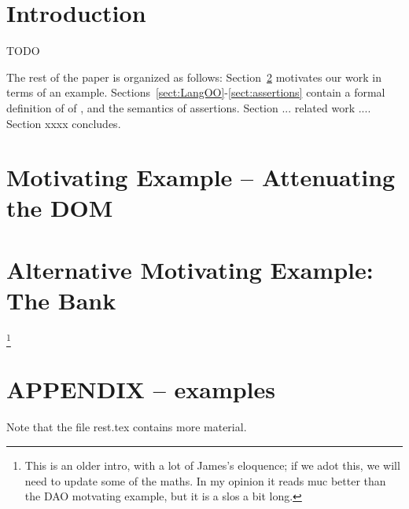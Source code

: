 \documentclass[acmsmall,screen]{acmart}
\begin{document}
\maketitle

\section{Introduction}
TODO

The rest of the paper is organized as follows: Section~\ref{sect:mitave:DOM} 
motivates our work in terms of an example. Sections~\ref{sect:LangOO}-\ref{sect:assertions} contain a formal definition of of \LangOO, and the semantics of assertions. Section ... related work .... Section xxxx concludes.



\section{Motivating Example -- Attenuating the DOM}
\label{sect:mitave:DOM}



\section{Alternative Motivating Example: The Bank}\footnote{This is an older intro, with a lot of James's eloquence; if we adot this, we will need to update some of the maths. In my opinion it reads muc better than the DAO motvating example, but it is a slos a bit long.}








\section*{APPENDIX -- examples}
Note that the file rest.tex contains more material.

\appendix

\appendix


\end{document}
